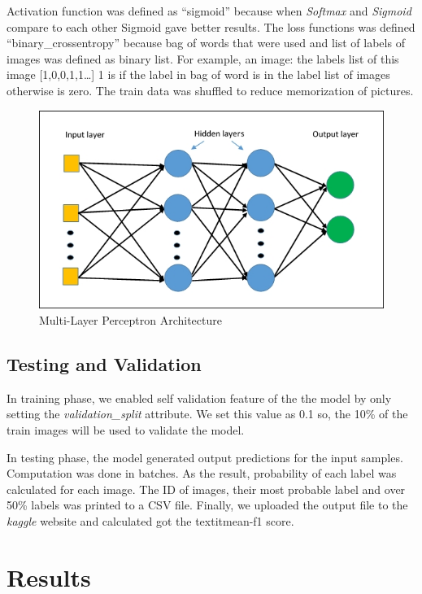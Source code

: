 \documentclass[12pt]{article}
\begin{document}
Activation function was defined as “sigmoid” because when \textit{Softmax} and \textit{Sigmoid} compare to each other Sigmoid gave better results. 
The loss functions was defined “binary\_crossentropy” because bag of words that were used and list of labels of images was defined as binary list. For example, an image: the labels list of this image [1,0,0,1,1…] 1 is if the label in bag of word is in the label list of images otherwise is zero. 
The train data was shuffled to reduce memorization of pictures.

\begin{figure}[H]
\centering
\includegraphics[width=.90\textwidth]{mlp.jpg}
\caption{Multi-Layer Perceptron Architecture}
\end{figure}

\subsection{Testing and Validation}

In training phase, we enabled self validation feature of the the model by only setting the \textit{validation\_split} attribute. We set this value as 0.1 so, the 10\% of the train images will be used to validate the model.

In testing phase, the model generated output predictions for the input samples. Computation was done in batches. As the result, probability of each label was calculated for each image. The ID of images, their most probable label and over 50\% labels was printed to a CSV file. Finally, we uploaded the output file to the \textit{kaggle} website and calculated got the textit{mean-f1} score.

\section{Results}
\end{document}
